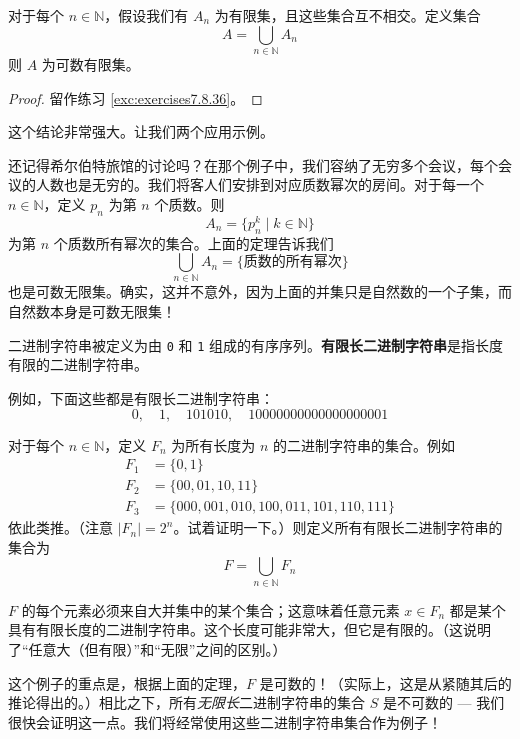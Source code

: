 \begin{corollary}\label{corollary7.6.23}
    对于每个 $n \in \mathbb{N}$，假设我们有 $A_n$ 为有限集，且这些集合互不相交。定义集合
    \[A = \bigcup_{n \in \mathbb{N}} A_n\]
    则 $A$ 为可数有限集。
\end{corollary}

\begin{proof}
    留作练习 \ref{exc:exercises7.8.36}。
\end{proof}

这个结论非常强大。让我们两个应用示例。\\

\begin{example}[所有质数幂次的集合]
    还记得希尔伯特旅馆的讨论吗？在那个例子中，我们容纳了无穷多个会议，每个会议的人数也是无穷的。我们将客人们安排到对应质数幂次的房间。对于每一个 $n \in \mathbb{N}$，定义 $p_n$ 为第 $n$ 个质数。则
    \[A_n = \{p_n^k \mid k \in \mathbb{N}\}\]
    为第 $n$ 个质数所有幂次的集合。上面的定理告诉我们
    \[\bigcup_{n \in \mathbb{N}} A_n = \{\text{质数的所有幂次}\}\]
    也是可数无限集。确实，这并不意外，因为上面的并集只是自然数的一个子集，而自然数本身是可数无限集！
\end{example}

\begin{example}[所有有限长二进制字符串的集合]\label{ex:example7.6.25}
    二进制字符串被定义为由 \verb|0| 和 \verb|1| 组成的有序序列。\textbf{有限长二进制字符串}是指长度有限的二进制字符串。

    例如，下面这些都是有限长二进制字符串：
    \[0, \quad 1, \quad 101010, \quad 10000000000000000001 \]

    对于每个 $n \in \mathbb{N}$，定义 $F_n$ 为所有长度为 $n$ 的二进制字符串的集合。例如
    \begin{align*}
        F_1 & = \{ 0 , 1 \}                                         \\
        F_2 & = \{ 00 , 01 , 10 , 11 \}                             \\
        F_3 & = \{ 000 , 001 , 010 , 100 , 011 , 101 , 110 , 111 \}
    \end{align*}
    依此类推。（注意 $|F_n| = 2^n$。试着证明一下。）则定义所有有限长二进制字符串的集合为
    \[F = \bigcup_{n \in \mathbb{N}} F_n\]

    $F$ 的每个元素必须来自大并集中的某个集合；这意味着任意元素 $x \in F_n$ 都是某个具有有限长度的二进制字符串。这个长度可能非常大，但它是有限的。（这说明了``任意大（但有限）''和``无限''之间的区别。）

    这个例子的重点是，根据上面的定理，$F$ 是可数的！（实际上，这是从紧随其后的推论得出的。）相比之下，所有\emph{无限长}二进制字符串的集合 $S$ 是不可数的 --- 我们很快会证明这一点。我们将经常使用这些二进制字符串集合作为例子！
\end{example}

